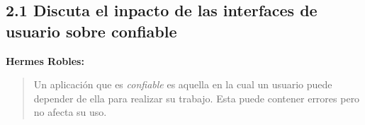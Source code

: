 
\subsection*{2.1 Discuta el inpacto de las interfaces de usuario sobre confiable}

\textbf{Hermes Robles:}

\begin{quote}
  Un aplicación que es \textit{confiable} es aquella en la cual
un usuario puede depender de ella para realizar su trabajo. Esta
puede contener errores pero no afecta su uso.
\end{quote}


